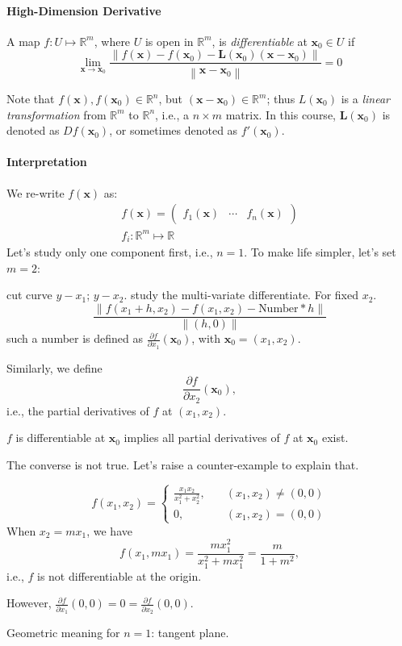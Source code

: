 \paragraph{High-Dimension Derivative}
\begin{definition}[Differentiable]
A map $f:U\mapsto\mathbb{R}^m$, where $U$ is open in $\mathbb{R}^m$, is \emph{differentiable} at $\bm x_0\in U$ if
\begin{equation}
\lim_{\bm x\to\bm x_0}
\frac{
\left\|
f(\bm x) - f(\bm x_0) - \bm L(\bm x_0)(\bm x-\bm x_0)
\right\|
}{
\left\|
\bm x-\bm x_0
\right\|
}=0
\end{equation}
\end{definition}
\begin{remark}
Note that $f(\bm x),f(\bm x_0)\in\mathbb{R}^n$, but $(\bm x-\bm x_0)\in\mathbb{R}^m$; thus $L(\bm x_0)$ is a \emph{linear transformation} from $\mathbb{R}^m$ to $\mathbb{R}^n$, i.e., a $n\times m$ matrix. In this course, $\bm L(\bm x_0)$ is denoted as $Df(\bm x_0)$, or sometimes denoted as $f'(\bm x_0)$.
\end{remark}
\paragraph{Interpretation}
We re-write $f(\bm x)$ as:
\[
\begin{array}{l}
f(\bm x)=\begin{pmatrix}
f_1(\bm x)&\cdots&f_n(\bm x)
\end{pmatrix}\\
f_i:\mathbb{R}^m\mapsto\mathbb{R}
\end{array}
\]
Let's study only one component first, i.e., $n=1$. To make life simpler, let's set $m=2$:

cut curve $y-x_1$; $y-x_2$. study the multi-variate differentiate. For fixed $x_2$.
\[
\frac{\|f(x_1+h,x_2) - f(x_1,x_2)-\mbox{Number} * h\|}{\|(h,0)\|}
\]
such a number is defined as $\frac{\partial f}{\partial x_1}(\bm x_0)$, with $\bm x_0=(x_1,x_2)$.

Similarly, we define
\[
\frac{\partial f}{\partial x_2}(\bm x_0),
\]
i.e., the partial derivatives of $f$ at $(x_1,x_2)$.
\begin{corollary}
$f$ is differentiable at $\bm x_0$ implies all partial derivatives of $f$ at $\bm x_0$ exist.
\end{corollary}
The converse is not true. Let's raise a counter-example to explain that.
\begin{example}
\[
f(x_1,x_2)=\left\{
\begin{aligned}
\frac{x_1x_2}{x_1^2+x_2^2},&\quad (x_1,x_2)\ne(0,0)\\
0,&\quad (x_1,x_2)=(0,0)
\end{aligned}
\right.
\]
When $x_2=mx_1$, we have
\[
f(x_1,mx_1) = \frac{mx_1^2}{x_1^2+mx_1^2}=\frac{m}{1+m^2},
\]
i.e., $f$ is not differentiable at the origin.

However, $\frac{\partial f}{\partial x_1}(0,0)=0=\frac{\partial f}{\partial x_2}(0,0)$.

\end{example}
Geometric meaning for $n=1$: tangent plane.

